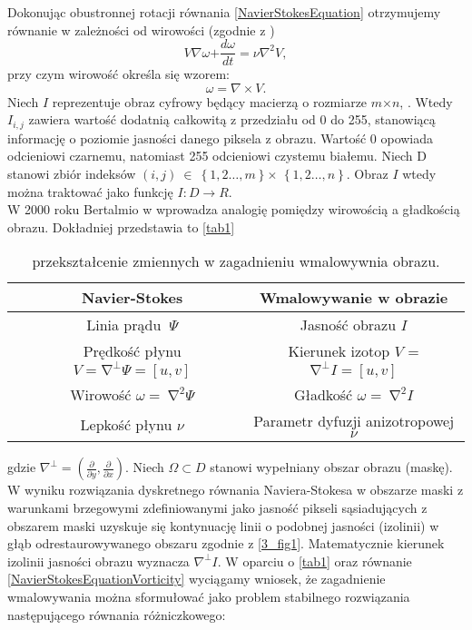 \documentclass[12pt, twoside, openany]{report}
\theoremstyle{definition}
\begin{document}
Dokonując obustronnej rotacji równania \eqref{NavierStokesEquation} otrzymujemy równanie w zależności od wirowości (zgodnie z \cite{StreamfuntionVorticityForm})
\begin{equation}
V\nabla \omega \mathrm{+}\frac{d\omega }{dt}\mathrm{=}\nu {\nabla }^{\mathrm{2}}V
\label{NavierStokesEquationVorticity}
,
\end{equation}
przy czym wirowość określa się wzorem:
\begin{equation}
\omega =\nabla \times V
\label{Vorticity}
.
\end{equation}
Niech $I$ reprezentuje obraz cyfrowy będący macierzą o rozmiarze $m \mathrm{\times} n$, \cite{ebrahimi2012navier}. Wtedy $I_{i,j}$ zawiera wartość dodatnią całkowitą z przedziału od 0 do 255, stanowiącą informację o poziomie jasności danego piksela z obrazu. Wartość 0 opowiada odcieniowi czarnemu, natomiast 255 odcieniowi czystemu białemu. Niech D stanowi zbiór indeksów $(i,j)\ \in \ \left\{1,2\dots ,m\right\} \mathrm{\times}$ $\left\{1,2\dots ,n\right\}$. Obraz $I$ wtedy można traktować jako funkcję $I:D\to R$. \\
W 2000 roku Bertalmio w \cite{BertalmioNavierStokes} wprowadza analogię pomiędzy wirowością a gładkością obrazu. Dokładniej przedstawia to \autoref{tab1}
\begin{table}[!h]
	\centering
	\begin{tabular}{|cc|c|}
	\hline \hline

		& Navier-Stokes
		& Wmalowywanie w obrazie\\ \hline
		
		& Linia prądu $\ \mathit{\Psi}$ &  Jasność obrazu $I$ \\ \hline
	
		& Prędkość płynu $V = {\mathrm{\nabla }}^{\bot }\mathit{\Psi} = [u, v]$  & Kierunek izotop $V$ = ${\mathrm{\nabla }}^{\bot }I = [u, v]$ \\ \hline
		& Wirowość $\omega =\ {\mathrm{\nabla }}^2\mathit{\Psi}$ & Gładkość $\omega =\ {\mathrm{\nabla }}^2I$ \\ \hline
		
		& Lepkość płynu $\nu $ & Parametr dyfuzji anizotropowej $\nu $ \\
	\hline
	\end{tabular}
	\caption{przekształcenie zmiennych w zagadnieniu wmalowywnia obrazu.}
	\label{tab1}
\end{table}
gdzie ${\nabla }^{\bot }=\left(\frac{\partial }{\partial y},\frac{\partial }{\partial x}\right)$.
Niech $\mathit{\Omega}\subset D$ stanowi wypełniany obszar obrazu (maskę). W wyniku rozwiązania dyskretnego równania Naviera-Stokesa w obszarze maski z warunkami brzegowymi zdefiniowanymi jako jasność pikseli sąsiadujących z obszarem maski uzyskuje się kontynuację linii o podobnej jasności (izolinii) w głąb odrestaurowywanego obszaru zgodnie z \autoref{3_fig1}.  Matematycznie kierunek izolinii jasności obrazu wyznacza ${\nabla }^{\bot }I$. W oparciu o \autoref{tab1} oraz równanie  \eqref{NavierStokesEquationVorticity} wyciągamy wniosek, że zagadnienie wmalowywania można sformułować jako problem stabilnego rozwiązania następującego równania różniczkowego:
\end{document}

